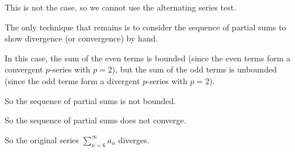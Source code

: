 \documentclass{ximera}
\begin{document}
\begin{question}
\begin{solution}
\begin{hint}
      This is not the case, so we cannot use the alternating series test.
    \end{hint}
    \begin{hint}
      The only technique that remains is to consider the sequence of partial sums to show divergence (or convergence) by hand.
    \end{hint}
    \begin{hint}
      In this case, the sum of the even terms is bounded (since the even terms form a convergent \(p\)-series with \(p = 2\)), but the sum of the odd terms is unbounded (since the odd terms form a divergent \(p\)-series with \(p = 2\)).
    \end{hint}
    \begin{hint}
      So the sequence of partial sums is not bounded.
    \end{hint}
    \begin{hint}
      So the sequence of partial sums does not converge.
    \end{hint}
    \begin{hint}
      So the original series  \(\displaystyle\sum_{n=6}^\infty a_{n} \) diverges.
    \end{hint}
    

    \begin{multiple-choice}
    \end{multiple-choice}

  \end{solution}
\end{question}
\end{document}
